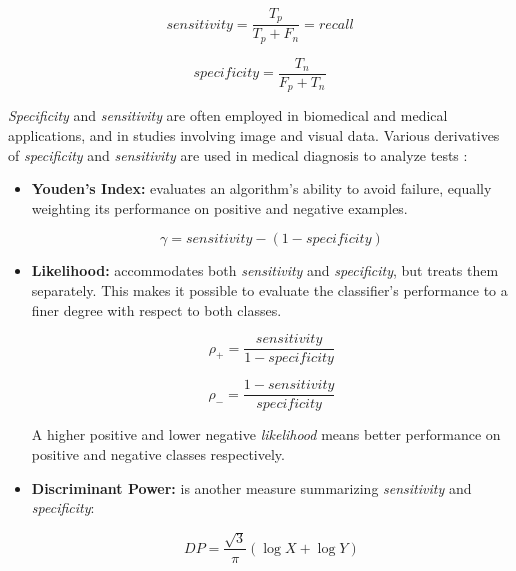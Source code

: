 \documentclass[10pt]{unbthesis}
\begin{document}
\begin{equation}
\label{equ:sensitivity}
sensitivity = \frac{T_p}{T_p + F_n}= recall
\end{equation}

\begin{equation}
\label{equ:specificity}
specificity = \frac{T_n}{F_p + T_n}
\end{equation}

\textit{Specificity} and \textit{sensitivity} are often employed in
biomedical and medical applications, and in studies involving image and
visual data. Various derivatives of \textit{specificity} and
\textit{sensitivity} are used in medical diagnosis to analyze tests \cite{RefWorks:37}:

\begin{itemize}
  \item \textbf{Youden's Index:} evaluates an algorithm's ability to
    avoid failure, equally weighting its performance on positive and
    negative examples.

    \begin{equation}
      \label{equ:youden}
      \gamma = sensitivity - (1 - specificity)
    \end{equation}
    
    \item \textbf{Likelihood:} accommodates both \textit{sensitivity}
      and \textit{specificity}, but treats them separately. This makes
      it possible to evaluate the classifier's performance to a finer
      degree with respect to both classes. 

      \begin{equation}
        \label{equ:likelihoodp}
        \rho_+ = \frac{sensitivity}{1 - specificity}
      \end{equation}

      \begin{equation}
        \label{equ:likelihoodn}
        \rho_- = \frac{1 - sensitivity}{specificity}
      \end{equation}

      A higher positive and lower negative \textit{likelihood} means
      better performance on positive and negative classes
      respectively. 

      \item \textbf{Discriminant Power:} is another measure
        summarizing \textit{sensitivity} and \textit{specificity}:

        \begin{equation}
          \label{equ:dp}
          DP = \frac{\sqrt{3}}{\pi}(\log{X} + \log{Y})
        \end{equation}


\end{itemize}
\end{document}
